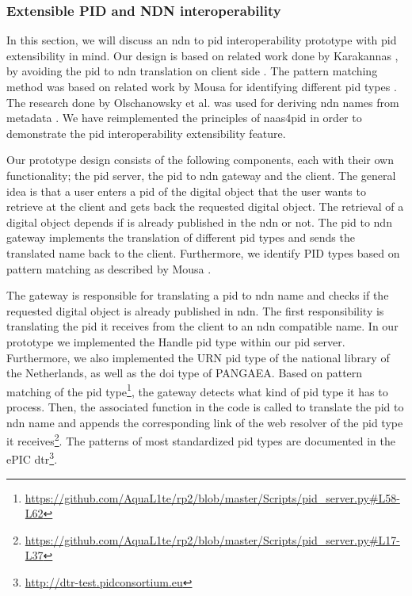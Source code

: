 \documentclass[conference]{IEEEtran}
\begin{document}
\subsubsection{Extensible PID and NDN interoperability}
\label{interoperablity}
In this section, we will discuss an \gls{ndn} to \gls{pid} interoperability prototype with \gls{pid} extensibility in mind. Our design is based on related work done by Karakannas \cite{icn-bd}, by avoiding the \gls{pid} to \gls{ndn} translation on client side \cite{icn-bd}. The pattern matching method was based on related work by Mousa for identifying different \gls{pid} types \cite{ndn-app-aware}. The research done by Olschanowsky et al. was used for deriving \gls{ndn} names from metadata \cite{ndn-man}. We have reimplemented the principles of \gls{naas4pid} in order to demonstrate the \gls{pid} interoperability extensibility feature.

Our prototype design consists of the following components, each with their own functionality; the \gls{pid} server, the \gls{pid} to \gls{ndn} gateway and the client. The general idea is that a user enters a \gls{pid} of the digital object that the user wants to retrieve at the client and gets back the requested digital object. The retrieval of a digital object depends if is already published in the \gls{ndn} or not. The \gls{pid} to \gls{ndn} gateway implements the translation of different \gls{pid} types and sends the translated name back to the client. Furthermore, we identify PID types based on pattern matching as described by Mousa \cite{ndn-app-aware}.

The gateway is responsible for translating a \gls{pid} to \gls{ndn} name and checks if the requested digital object is already published in \gls{ndn}. The first responsibility is translating the \gls{pid} it receives from the client to an \gls{ndn} compatible name. In our prototype we implemented the Handle \gls{pid} type within our \gls{pid} server. Furthermore, we also implemented the URN \gls{pid} type of the national library of the Netherlands, as well as the \gls{doi} type of PANGAEA. Based on pattern matching of the \gls{pid} type\footnote{\url{https://github.com/AquaL1te/rp2/blob/master/Scripts/pid_server.py\#L58-L62}}, the gateway detects what kind of \gls{pid} type it has to process. Then, the associated function in the code is called to translate the \gls{pid} to \gls{ndn} name and appends the corresponding link of the web resolver of the \gls{pid} type it receives\footnote{\url{https://github.com/AquaL1te/rp2/blob/master/Scripts/pid_server.py\#L17-L37}}. The patterns of most standardized \gls{pid} types are documented in the ePIC \gls{dtr}\footnote{\url{http://dtr-test.pidconsortium.eu}}.
\end{document}
